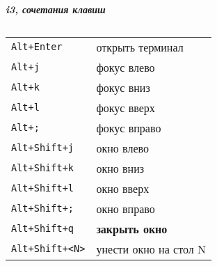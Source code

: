 




\raggedright
\footnotesize

\begin{center}
    \Large{\textbf{\textit{i3, сочетания клавиш}}} \\
\end{center}
\vspace*{0.5cm}

\begin{multicols}{3}


\setlength{\premulticols}{1pt}
\setlength{\postmulticols}{1pt}
\setlength{\multicolsep}{1pt}
\setlength{\columnsep}{2pt}

\section{}
\begin{tabular}{@{}ll@{}}
    \verb!Alt+Enter! &  открыть терминал \\
    \verb!Alt+j! & фокус влево \\
    \verb!Alt+k! & фокус вниз \\
    \verb!Alt+l! & фокус вверх \\
    \verb!Alt+;! & фокус вправо \\
    \verb!Alt+Shift+j! & окно влево \\
    \verb!Alt+Shift+k! & окно вниз \\
    \verb!Alt+Shift+l! & окно вверх \\
    \verb!Alt+Shift+;! & окно вправо \\
\verb!Alt+Shift+q! & \textbf{закрыть окно} \\
    \verb!Alt+Shift+<N>! & унести окно на стол N \\
\end{tabular}


\end{multicols}
